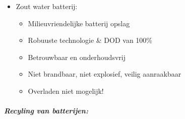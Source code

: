 \documentclass[12pt]{article}
\begin{document}
\begin{itemize}
\begin{itemize}
\begin{itemize}
        \end{itemize}
        \item Zout water batterij:\begin{itemize}
            \item Milieuvriendelijke batterij opslag 
            \item Robuuste technologie \& DOD van 100\%
            \item Betrouwbaar en onderhoudsvrij
            \item Niet brandbaar, niet explosief, veilig aanraakbaar
            \item Overladen niet mogelijk!
        \end{itemize}
    \end{itemize}
\end{itemize}
\subparagraph{Recyling van batterijen:}
\end{document}
